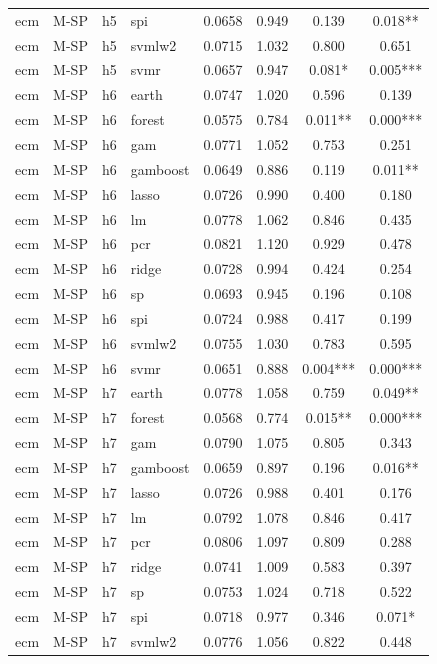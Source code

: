 \begin{ThreePartTable}
\begin{longtable}[t]{llclcccc}
ecm & M-SP & h5 & spi & 0.0658 & 0.949 & 0.139 & 0.018**\\
ecm & M-SP & h5 & svmlw2 & 0.0715 & 1.032 & 0.800 & 0.651\\
ecm & M-SP & h5 & svmr & 0.0657 & 0.947 & 0.081* & 0.005***\\
\addlinespace
ecm & M-SP & h6 & earth & 0.0747 & 1.020 & 0.596 & 0.139\\
ecm & M-SP & h6 & forest & 0.0575 & 0.784 & 0.011** & 0.000***\\
ecm & M-SP & h6 & gam & 0.0771 & 1.052 & 0.753 & 0.251\\
ecm & M-SP & h6 & gamboost & 0.0649 & 0.886 & 0.119 & 0.011**\\
ecm & M-SP & h6 & lasso & 0.0726 & 0.990 & 0.400 & 0.180\\
ecm & M-SP & h6 & lm & 0.0778 & 1.062 & 0.846 & 0.435\\
ecm & M-SP & h6 & pcr & 0.0821 & 1.120 & 0.929 & 0.478\\
ecm & M-SP & h6 & ridge & 0.0728 & 0.994 & 0.424 & 0.254\\
ecm & M-SP & h6 & sp & 0.0693 & 0.945 & 0.196 & 0.108\\
ecm & M-SP & h6 & spi & 0.0724 & 0.988 & 0.417 & 0.199\\
ecm & M-SP & h6 & svmlw2 & 0.0755 & 1.030 & 0.783 & 0.595\\
ecm & M-SP & h6 & svmr & 0.0651 & 0.888 & 0.004*** & 0.000***\\
\addlinespace
ecm & M-SP & h7 & earth & 0.0778 & 1.058 & 0.759 & 0.049**\\
ecm & M-SP & h7 & forest & 0.0568 & 0.774 & 0.015** & 0.000***\\
ecm & M-SP & h7 & gam & 0.0790 & 1.075 & 0.805 & 0.343\\
ecm & M-SP & h7 & gamboost & 0.0659 & 0.897 & 0.196 & 0.016**\\
ecm & M-SP & h7 & lasso & 0.0726 & 0.988 & 0.401 & 0.176\\
ecm & M-SP & h7 & lm & 0.0792 & 1.078 & 0.846 & 0.417\\
ecm & M-SP & h7 & pcr & 0.0806 & 1.097 & 0.809 & 0.288\\
ecm & M-SP & h7 & ridge & 0.0741 & 1.009 & 0.583 & 0.397\\
ecm & M-SP & h7 & sp & 0.0753 & 1.024 & 0.718 & 0.522\\
ecm & M-SP & h7 & spi & 0.0718 & 0.977 & 0.346 & 0.071*\\
ecm & M-SP & h7 & svmlw2 & 0.0776 & 1.056 & 0.822 & 0.448\\

\end{longtable}
\end{ThreePartTable}
